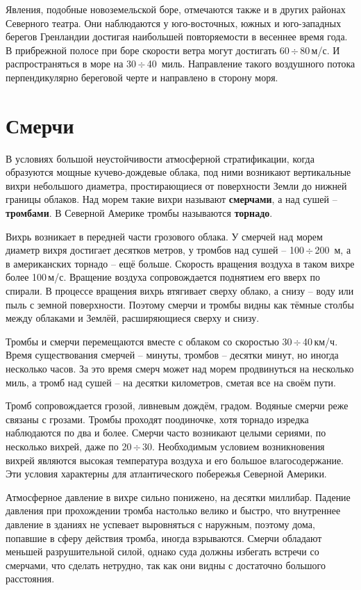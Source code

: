 \documentclass[a4paper, 12pt, twoside, final, book, russian, fittopage, cyremdash, openright]{ncc}
\newcommand{\mps}{\,м/с\xspace}
\newcommand{\kph}{\,км/ч\xspace}
\newcommand{\otdo}{\,\ensuremath{\div}\,}
\begin{document}
Явления, подобные новоземельской боре, отмечаются также и в других
районах Северного театра. Они наблюдаются у юго-восточных, южных и
юго-западных берегов Гренландии достигая наибольшей повторяемости в
весеннее время года. В прибрежной полосе при боре скорости ветра могут
достигать 60\otdo{}80\mps{}. И распространяться в море на
30\otdo{}40~миль. Направление такого воздушного потока перпендикулярно
береговой черте и направлено в сторону моря.

\section{Смерчи}
\label{sec:tornados}

В условиях большой неустойчивости атмосферной стратификации, когда
образуются мощные кучево-дождевые облака, под ними возникают
вертикальные вихри небольшого диаметра, простирающиеся от поверхности
Земли до нижней границы облаков. Над морем такие вихри называют
\textbf{смерчами}, а над сушей \---
\textbf{тромбами}. В Северной Америке тромбы называются
\textbf{торнадо}.

Вихрь возникает в передней части грозового облака. У смерчей над морем
диаметр вихря достигает десятков метров, у тромбов над сушей \---
100\otdo{}200~м, а в американских торнадо \--- ещё больше. Скорость
вращения воздуха в таком вихре более 100\mps{}. Вращение воздуха
сопровождается поднятием его вверх по спирали. В процессе вращения
вихрь втягивает сверху облако, а снизу \--- воду или пыль с земной
поверхности. Поэтому смерчи и тромбы видны как тёмные столбы между
облаками и Землёй, расширяющиеся сверху и снизу.

Тромбы и смерчи перемещаются вместе с облаком со скоростью
30\otdo{}40\kph{}. Время существования смерчей \--- минуты, тромбов \---
десятки минут, но иногда несколько часов. За это время смерч может над
морем продвинуться на несколько миль, а тромб над сушей \--- на десятки
километров, сметая все на своём пути.

Тромб сопровождается грозой, ливневым дождём, градом. Водяные смерчи
реже связаны с грозами. Тромбы проходят поодиночке, хотя торнадо
изредка наблюдаются по два и более. Смерчи часто возникают целыми
сериями, по несколько вихрей, даже по 20\otdo{}30. Необходимым условием
возникновения вихрей являются высокая температура воздуха и его
большое влагосодержание. Эти условия характерны для атлантического
побережья Северной Америки.

Атмосферное давление в вихре сильно понижено, на десятки
миллибар. Падение давления при прохождении тромба настолько велико и
быстро, что внутреннее давление в зданиях не успевает выровняться с
наружным, поэтому дома, попавшие в сферу действия тромба, иногда
взрываются. Смерчи обладают меньшей разрушительной силой, однако суда
должны избегать встречи со смерчами, что сделать нетрудно, так как они
видны с достаточно большого расстояния.
\end{document}
